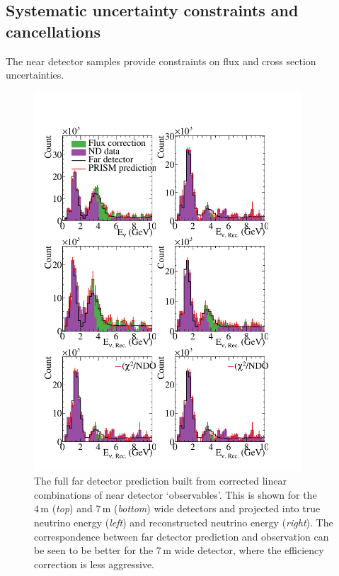 
\subsection{Systematic uncertainty constraints and cancellations}

The near detector samples provide constraints on flux and cross section uncertainties.



\begin{figure}
  \centering
  \includegraphics[width=10cm]{graphics/PRISMPrediction_Scan.pdf}
  \caption{The full far detector prediction built from corrected linear combinations of near detector `observables'. This is shown for the $4\,\textrm{m}$ (\emph{top}) and $7\,\textrm{m}$ (\emph{bottom}) wide detectors and projected into true neutrino energy (\emph{left}) and reconstructed neutrino energy (\emph{right}). The correspondence between far detector prediction and observation can be seen to be better for the $7\,\textrm{m}$ wide detector, where the efficiency correction is less aggressive. }
  \label{fig:PRISM_PRISMPrediction}
\end{figure}

